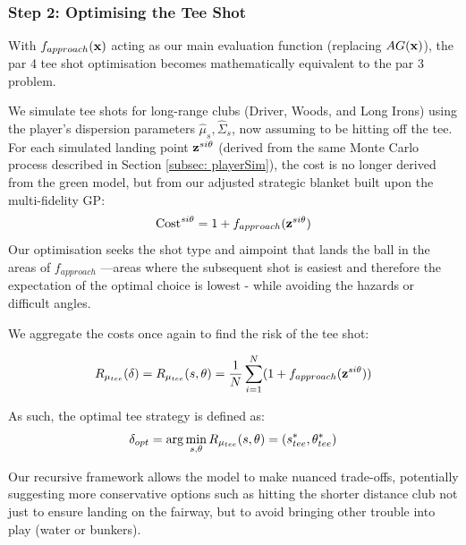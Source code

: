 \documentclass[11pt, letterpaper]{article}
\begin{document}
\subsubsection{Step 2: Optimising the Tee Shot}
With $f_{approach}(\mathbf{x})$ acting as our main evaluation function (replacing $AG(\mathbf{x})$), the par 4 tee shot optimisation becomes mathematically equivalent to the par 3 problem.

We simulate tee shots for long-range clubs (Driver, Woods, and Long Irons) using the player's dispersion parameters $\hat\mu_{s},\hat\Sigma_{s} $, now assuming to be hitting off the tee. For each simulated landing point $\mathbf{z}^{si\theta}$ (derived from the same Monte Carlo process described in Section \ref{subsec: playerSim}), the cost is no longer derived from the green model, but from our adjusted strategic blanket built upon the multi-fidelity GP:
$$\text{Cost}^{si \theta} = 1 + f_{approach}(\mathbf{z}^{si\theta})$$
Our optimisation seeks the shot type and aimpoint that lands the ball in the areas of $f_{approach}$ ---areas where the subsequent shot is easiest and therefore the expectation of the optimal choice is lowest - while avoiding the hazards or difficult angles. 

We aggregate the costs once again to find the risk of the tee shot:

$$ R _{\mu_{tee}}(\delta)= R_{\mu_{tee}}(s, \theta) = \frac{1}{N} \sum^N_{i =1} (1 + f_{approach}(\mathbf{z}^{si\theta}))$$

As such, the optimal tee strategy is defined as:
$$\delta_{opt}  = \arg \min_{s, \theta} R_{\mu_{tee}}(s, \theta) =  (s^*_{tee}, \theta^*_{tee})$$

Our recursive framework allows the model to make nuanced trade-offs, potentially suggesting more conservative options such as hitting the shorter distance club not just to ensure landing on the fairway, but to avoid bringing other trouble into play (water or bunkers).

    
    
\end{document}

